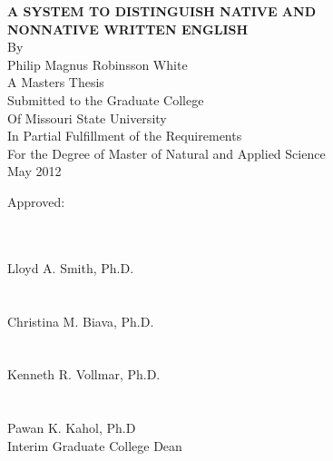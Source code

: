 \documentclass[main.tex]{subfiles}
\begin{document}
\centering

\textbf{A SYSTEM TO DISTINGUISH NATIVE AND\\NONNATIVE WRITTEN ENGLISH}\\
By\\
Philip Magnus Robinsson White\\
\null\null
\singlespacing
A Masters Thesis\\
Submitted to the Graduate College\\
Of Missouri State University\\
In Partial Fulfillment of the Requirements\\
For the Degree of Master of Natural and Applied Science\\
\null
\null
May 2012\\
\null\null\null\null\null\null\null\null\null\null
\raggedleft
\begin{minipage}[t]{3.5in}
Approved:\\\\
\begin{flushright}
\begin{minipage}[b]{3.2in}
\makebox[3.2in]{\hrulefill}\\
Lloyd A. Smith, Ph.D.\\\\
\makebox[3.2in]{\hrulefill}\\
Christina M. Biava, Ph.D.\\\\
\makebox[3.2in]{\hrulefill}\\
Kenneth R. Vollmar, Ph.D.\\\\
\makebox[3.2in]{\hrulefill}\\
Pawan K. Kahol, Ph.D\\Interim Graduate College Dean\\
\end{minipage}
\end{flushright}
\end{minipage}
\end{document}
